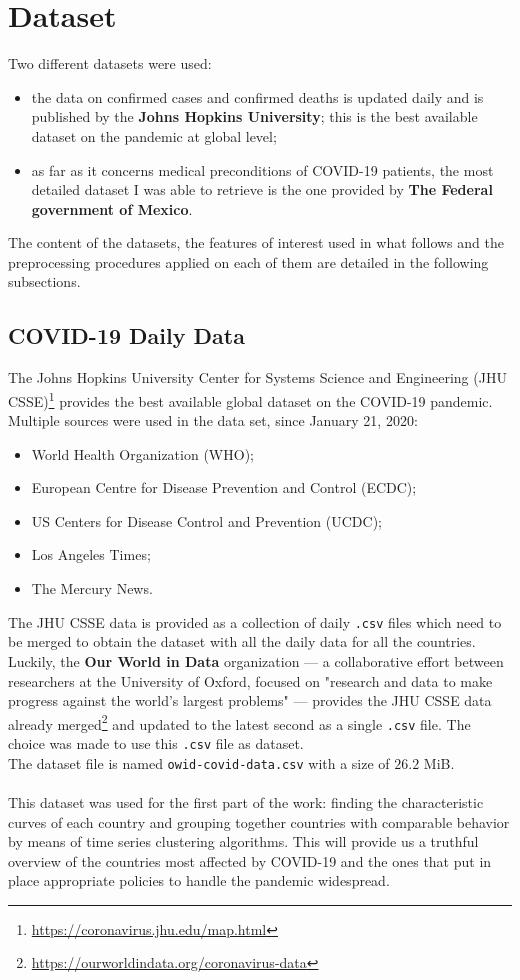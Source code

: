 \documentclass[11pt,a4paper]{article}
\begin{document}
\newpage
\section{Dataset}
Two different datasets were used:
\begin{itemize}
    \item the data on confirmed cases and confirmed deaths is updated daily and
    is published by the \textbf{Johns Hopkins University}; this is the best
    available dataset on the pandemic at global level;
    \item as far as it concerns medical preconditions of COVID-19 patients,
    the most detailed dataset I was able to retrieve is the one provided by
    \textbf{The Federal government of Mexico}.
\end{itemize}
The content of the datasets, the features of interest used in what follows and
the preprocessing procedures applied on each of them are detailed in the
following subsections.
\subsection{COVID-19 Daily Data}
The Johns Hopkins University Center for Systems Science and Engineering
(JHU CSSE)\footnote{\url{https://coronavirus.jhu.edu/map.html}} provides the
best available global dataset on the COVID-19 pandemic. Multiple sources were
used in the data set, since January 21, 2020:
\begin{itemize}
    \item World Health Organization (WHO);
    \item European Centre for Disease Prevention and Control (ECDC);
    \item US Centers for Disease Control and Prevention (UCDC);
    \item Los Angeles Times;
    \item The Mercury News.
\end{itemize}
The JHU CSSE data is provided as a collection of daily \texttt{.csv} files which
need to be merged to obtain the dataset with all the daily data for all the
countries. Luckily, the \textbf{Our World in Data} organization --- a
collaborative effort between researchers at the University of Oxford, focused on
"research and data to make progress against the world's largest problems" ---
provides the JHU CSSE data already
merged\footnote{\url{https://ourworldindata.org/coronavirus-data}} and updated
to the latest second as a single \texttt{.csv} file. The choice was made to use
this \texttt{.csv} file as dataset.\\
The dataset file is named \texttt{owid-covid-data.csv} with a size of $26.2$
MiB.\\
\\
This dataset was used for the first part of the work: finding the characteristic
curves of each country and grouping together countries with comparable behavior
by means of time series clustering algorithms. This will provide us a truthful
overview of the countries most affected by COVID-19 and the ones that put in 
place appropriate policies to handle the pandemic widespread.
\end{document}
